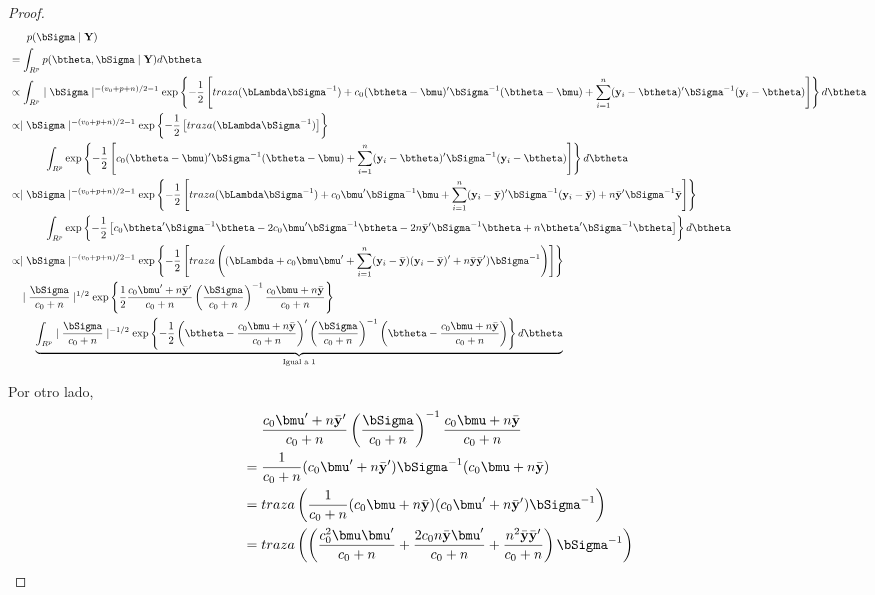 \begin{proof}
\begin{align*}
&\ \ \ \ \ p(\bSigma\mid\mathbf{Y})\\
&=\int_{R^p} p(\btheta,\bSigma\mid\mathbf{Y})d\btheta\\
&\propto \int_{R^p}\mid\bSigma\mid^{-(v_0+p+n)/2-1}\exp\left\{-\frac{1}{2}\left[traza(\bLambda\bSigma^{-1})+c_0(\btheta-\bmu)'\bSigma^{-1}(\btheta-\bmu)+\sum_{i=1}^n(\mathbf{y}_i-\btheta)'\bSigma^{-1}(\mathbf{y}_i-\btheta)\right]\right\}d\btheta\\
&\propto \mid\bSigma\mid^{-(v_0+p+n)/2-1} \exp\left\{-\frac{1}{2}\left[traza(\bLambda\bSigma^{-1})\right]\right\}\\
&\ \ \ \ \ \ \ \ \ \ \int_{R^p}\exp\left\{-\frac{1}{2}\left[c_0(\btheta-\bmu)'\bSigma^{-1}(\btheta-\bmu)+\sum_{i=1}^n(\mathbf{y}_i-\btheta)'\bSigma^{-1}(\mathbf{y}_i-\btheta)\right]\right\}d\btheta\\
&\propto \mid\bSigma\mid^{-(v_0+p+n)/2-1} \exp\left\{-\frac{1}{2}\left[traza(\bLambda\bSigma^{-1})+c_0\bmu'\bSigma^{-1}\bmu+\sum_{i=1}^n(\mathbf{y}_i-\bar{\mathbf{y}})'\bSigma^{-1}(\mathbf{y}_i-\bar{\mathbf{y}})+n\bar{\mathbf{y}}'\bSigma^{-1}\bar{\mathbf{y}}\right]\right\}\\
&\ \ \ \ \ \ \ \ \ \ \int_{R^p}\exp\left\{-\frac{1}{2}\left[c_0\btheta'\bSigma^{-1}\btheta-2c_0\bmu'\bSigma^{-1}\btheta-2n\bar{\mathbf{y}}'\bSigma^{-1}\btheta+n\btheta'\bSigma^{-1}\btheta\right]\right\}d\btheta\\
&\propto \mid\bSigma\mid^{-(v_0+p+n)/2-1} \exp\left\{-\frac{1}{2}\left[traza\left((\bLambda+c_0\bmu\bmu'+\sum_{i=1}^n(\mathbf{y}_i-\bar{\mathbf{y}})(\mathbf{y}_i-\bar{\mathbf{y}})'+n\bar{\mathbf{y}}\bar{\mathbf{y}}')\bSigma^{-1}\right)\right]\right\}\\
&\ \ \ \mid\frac{\bSigma}{c_0+n}\mid^{1/2}\exp\left\{\frac{1}{2}\frac{c_0\bmu'+n\bar{\mathbf{y}}'}{c_0+n}\left(\frac{\bSigma}{c_0+n}\right)^{-1}\frac{c_0\bmu+n\bar{\mathbf{y}}}{c_0+n}\right\}\\
&\ \ \ \ \ \ \ \underbrace{\int_{R^p}\mid\frac{\bSigma}{c_0+n}\mid^{-1/2}\exp\left\{-\frac{1}{2}\left(\btheta-\frac{c_0\bmu+n\bar{\mathbf{y}}}{c_0+n}\right)'\left(\frac{\bSigma}{c_0+n}\right)^{-1}\left(\btheta-\frac{c_0\bmu+n\bar{\mathbf{y}}}{c_0+n}\right)\right\}d\btheta}_{\text{Igual a 1}}
\end{align*}

Por otro lado, 
\begin{align*}
&\ \ \ \ \frac{c_0\bmu'+n\bar{\mathbf{y}}'}{c_0+n}\left(\frac{\bSigma}{c_0+n}\right)^{-1}\frac{c_0\bmu+n\bar{\mathbf{y}}}{c_0+n}\\
&=\frac{1}{c_0+n}(c_0\bmu'+n\bar{\mathbf{y}}')\bSigma^{-1}(c_0\bmu+n\bar{\mathbf{y}})\\
&=traza\left(\frac{1}{c_0+n}(c_0\bmu+n\bar{\mathbf{y}})(c_0\bmu'+n\bar{\mathbf{y}}')\bSigma^{-1}\right)\\
&=traza\left(\left(\frac{c_0^2\bmu\bmu'}{c_0+n}+\frac{2c_0n\bar{\mathbf{y}}\bmu'}{c_0+n}+\frac{n^2\bar{\mathbf{y}}\bar{\mathbf{y}}'}{c_0+n}\right)\bSigma^{-1}\right)
\end{align*}


\end{proof}
